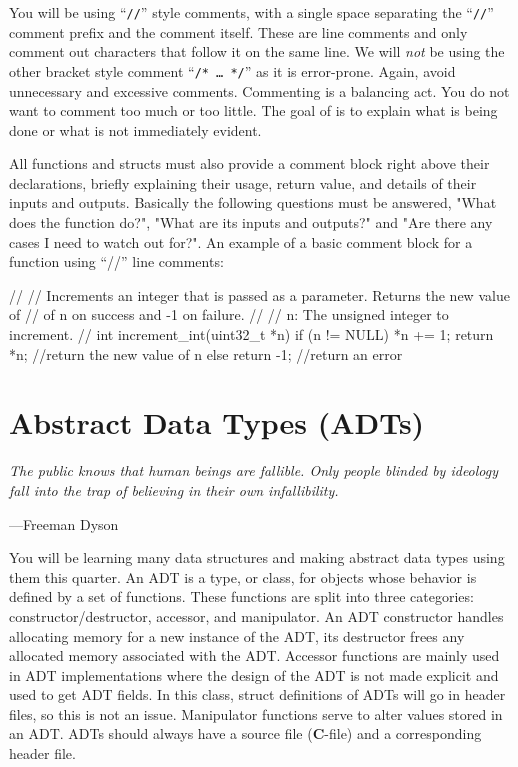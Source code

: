 \documentclass[11pt]{article}
\begin{document}
\noindent You will be using ``\texttt{//}'' style comments, with a single space
separating the ``\texttt{//}'' comment prefix and the comment itself. These are
line comments and only comment out characters that follow it on the same line.
We will \emph{not} be using the other bracket style comment ``\texttt{/* \ldots
*/}'' as it is error-prone.  Again, avoid unnecessary and excessive comments.
Commenting is a balancing act.  You do not want to comment too much or too
little. The goal of is to explain what is being done or what is not immediately
evident.

All functions and structs must also provide a comment block right above their
declarations, briefly explaining their usage, return value, and details of their
inputs and outputs. Basically the following questions must be answered,
"What does the function do?",
"What are its inputs and outputs?" and "Are there any cases I need to watch out for?".
An example of a basic comment block for a function using
``//'' line comments:

\begin{codelisting}{}
//
// Increments an integer that is passed as a parameter. Returns the new value of
// of n on success and -1 on failure.
//
// n:  The unsigned integer to increment.
//
int increment_int(uint32_t *n) {
    if (n != NULL) {
        *n += 1;
        return *n; //return the new value of n
    } else {
        return -1; //return an error
  }
}
\end{codelisting}


\section{Abstract Data Types (ADTs)}

\epigraph{\emph{The public knows that human beings are fallible. Only
people blinded by ideology fall into the trap of believing in their
own infallibility.}}{---Freeman Dyson}

\noindent You will be learning many data structures and making abstract data
types using them this quarter. An ADT is a type, or class, for objects whose
behavior is defined by a set of functions. These functions are split into three
categories: constructor/destructor, accessor, and manipulator. An ADT
constructor handles allocating memory for a new instance of the ADT, its
destructor frees any allocated memory associated with the ADT. Accessor
functions are mainly used in ADT implementations where the design of the ADT is
not made explicit and used to get ADT fields. In this class, struct definitions
of ADTs will go in header files, so this is not an issue. Manipulator functions
serve to alter values stored in an ADT. ADTs should always have a source file
(\textbf{C}-file) and a corresponding header file.
\end{document}
